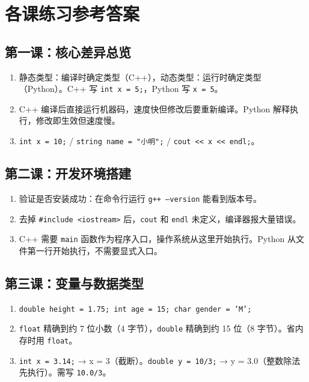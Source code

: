 \documentclass[a4paper,12pt]{ctexart}
\begin{document}
\section*{\textcolor{blue!70!black}{各课练习参考答案}}

\subsection*{第一课：核心差异总览}
\begin{enumerate}
  \item 静态类型：编译时确定类型（C++），动态类型：运行时确定类型（Python）。C++ 写 \texttt{int x = 5;}，Python 写 \texttt{x = 5}。
  \item C++ 编译后直接运行机器码，速度快但修改后要重新编译。Python 解释执行，修改即生效但速度慢。
  \item \texttt{int x = 10;} / \texttt{string name = "小明";} / \texttt{cout << x << endl;}。
\end{enumerate}

\subsection*{第二课：开发环境搭建}
\begin{enumerate}
  \item 验证是否安装成功：在命令行运行 \texttt{g++ --version} 能看到版本号。
  \item 去掉 \texttt{\#include <iostream>} 后，\texttt{cout} 和 \texttt{endl} 未定义，编译器报大量错误。
  \item C++ 需要 \texttt{main} 函数作为程序入口，操作系统从这里开始执行。Python 从文件第一行开始执行，不需要显式入口。
\end{enumerate}

\subsection*{第三课：变量与数据类型}
\begin{enumerate}
  \item \texttt{double height = 1.75; int age = 15; char gender = 'M';}
  \item \texttt{float} 精确到约 7 位小数（4 字节），\texttt{double} 精确到约 15 位（8 字节）。省内存时用 \texttt{float}。
  \item \texttt{int x = 3.14;} → x = 3（截断）。\texttt{double y = 10/3;} → y = 3.0（整数除法先执行）。需写 \texttt{10.0/3}。
\end{enumerate}
\end{document}
